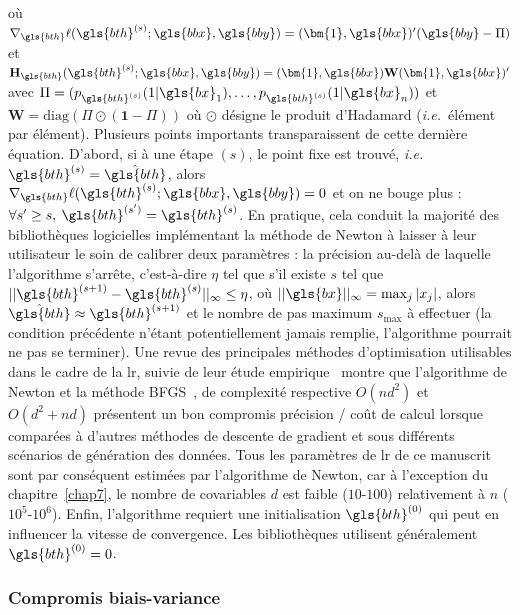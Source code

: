 où $ \nabla_{\gls{bth}} \ell(\gls{bth}^{(s)};\gls{bbx},\gls{bby}) = (\bm{1},\gls{bbx})' (\gls{bby} - \Pi)$ et $\mathbf{H}_{{\gls{bth}}}(\gls{bth}^{(s)};\gls{bbx},\gls{bby}) = (\bm{1},\gls{bbx}) \mathbf{W} (\bm{1},\gls{bbx})'$ avec $\Pi = (p_{\gls{bth}^{(s)}}(1|\gls{bx}_1),\dots,p_{\gls{bth}^{(s)}}(1|\gls{bx}_n))$ et $\mathbf{W} = \text{diag}(\Pi \odot (\bm{1}-\Pi))$ où $\odot$ désigne le produit d'Hadamard (\textit{i.e.}\ élément par élément). Plusieurs points importants transparaissent de cette dernière équation. D'abord, si à une étape $(s)$, le point fixe est trouvé, \textit{i.e.}\ $\gls{bth}^{(s)} = \hat{\gls{bth}}$, alors $\nabla_{\gls{bth}} \ell(\gls{bth}^{(s)};\gls{bbx},\gls{bby}) = 0$ et on ne bouge plus : $\forall s' \geq s, \: \gls{bth}^{(s')} = \gls{bth}^{(s)}$. En pratique, cela conduit la majorité des bibliothèques logicielles implémentant la méthode de Newton à laisser à leur utilisateur le soin de calibrer deux paramètres : la précision au-delà de laquelle l'algorithme s'arrête, c'est-à-dire $\eta$ tel que s'il existe $s$ tel que $||\gls{bth}^{(s+1)} - \gls{bth}^{(s)}||_{\infty} \leq \eta$, où $|| \gls{bx} ||_{\infty} = \max_{j} |x_j|$, alors $\hat{\gls{bth}} \approx \gls{bth}^{(s+1)}$ et le nombre de pas maximum $s_{\text{max}}$ à effectuer (la condition précédente n'étant potentiellement jamais remplie, l'algorithme pourrait ne pas se terminer). Une revue des principales méthodes d'optimisation utilisables dans le cadre de la \gls{lr}, suivie de leur étude empirique~\cite{minka2003comparison} montre que l'algorithme de Newton et la méthode BFGS~\cite{byrd1995limited}, de complexité respective $O(nd^2)$ et $O(d^2 + nd)$ présentent un bon compromis précision / coût de calcul lorsque comparées à d'autres méthodes de descente de gradient et sous différents scénarios de génération des données. Tous les paramètres de \gls{lr} de ce manuscrit sont par conséquent estimées par l'algorithme de Newton, car à l'exception du chapitre~\ref{chap7}, le nombre de covariables $d$ est faible ($10$-$100$) relativement à $n$ ($10^5$-$10^6$). Enfin, l'algorithme requiert une initialisation $\gls{bth}^{(0)}$ qui peut en influencer la vitesse de convergence. Les bibliothèques utilisent généralement $\gls{bth}^{(0)}=0$.

\subsubsection{Compromis biais-variance}

